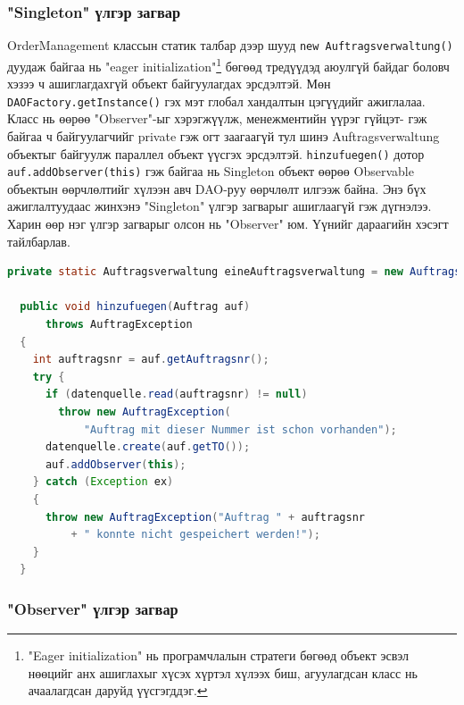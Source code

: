 \subsubsection{"Singleton" үлгэр загвар}
OrderManagement классын статик талбар дээр шууд \verb|new Auftragsverwaltung()| дуудаж байгаа нь "eager initialization"\footnote{"Eager initialization" нь програмчлалын стратеги бөгөөд объект эсвэл нөөцийг анх ашиглахыг хүсэх хүртэл хүлээх биш, агуулагдсан класс нь ачаалагдсан даруйд үүсгэгддэг.} бөгөөд тредүүдэд аюулгүй байдаг боловч хэзээ ч ашиглагдахгүй объект байгуулагдах эрсдэлтэй. Мөн \verb|DAOFactory.getInstance()| гэх мэт глобал хандалтын цэгүүдийг ажиглалаа.   Класс нь өөрөө "Observer"-ыг хэрэгжүүлж, менежментийн үүрэг гүйцэт- гэж байгаа ч байгуулагчийг private гэж огт заагаагүй тул шинэ Auftragsverwaltung объектыг байгуулж параллел объект үүсгэх эрсдэлтэй. \verb|hinzufuegen()| дотор \verb|auf.addObserver(this)| гэж байгаа нь Singleton объект өөрөө Observable объектын өөрчлөлтийг хүлээн авч DAO-руу өөрчлөлт илгээж байна. Энэ бүх ажиглалтуудаас жинхэнэ "Singleton" үлгэр загварыг ашиглаагүй гэж дүгнэлээ. Харин өөр нэг үлгэр загварыг олсон нь "Observer" юм. Үүнийг дараагийн хэсэгт тайлбарлав.
\begin{lstlisting}[language=Java, caption=OrderManagement классын арга hinzufuegen, frame=single]
  private static Auftragsverwaltung eineAuftragsverwaltung = new Auftragsverwaltung();

  public void hinzufuegen(Auftrag auf)
      throws AuftragException
  {
    int auftragsnr = auf.getAuftragsnr();
    try {
      if (datenquelle.read(auftragsnr) != null)
        throw new AuftragException(
            "Auftrag mit dieser Nummer ist schon vorhanden");
      datenquelle.create(auf.getTO());
      auf.addObserver(this);
    } catch (Exception ex)
    {
      throw new AuftragException("Auftrag " + auftragsnr
          + " konnte nicht gespeichert werden!");
    }
  }
\end{lstlisting}

\subsubsection{"Observer" үлгэр загвар}

